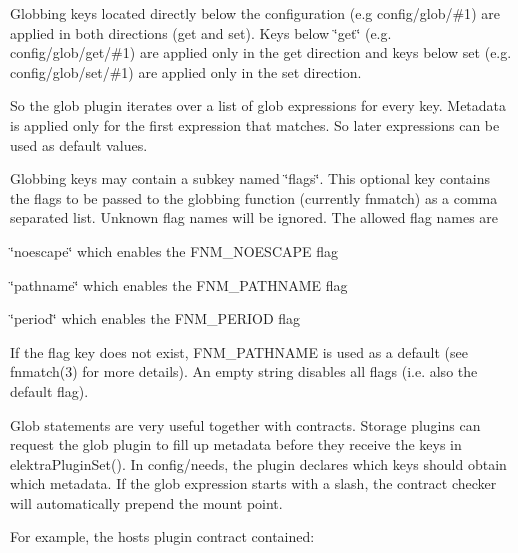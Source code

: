Globbing keys located directly below the configuration (e.\+g {\ttfamily config/glob/\#1}) are applied in both directions (get and set). Keys below \char`\"{}get\char`\"{} (e.\+g. {\ttfamily config/glob/get/\#1}) are applied only in the get direction and keys below set (e.\+g. {\ttfamily config/glob/set/\#1}) are applied only in the set direction.

So the glob plugin iterates over a list of glob expressions for every key. Metadata is applied only for the first expression that matches. So later expressions can be used as default values.

Globbing keys may contain a subkey named \char`\"{}flags\char`\"{}. This optional key contains the flags to be passed to the globbing function (currently fnmatch) as a comma separated list. Unknown flag names will be ignored. The allowed flag names are


\begin{DoxyItemize}
\item \char`\"{}noescape\char`\"{} which enables the F\+N\+M\+\_\+\+N\+O\+E\+S\+C\+A\+PE flag
\item \char`\"{}pathname\char`\"{} which enables the F\+N\+M\+\_\+\+P\+A\+T\+H\+N\+A\+ME flag
\item \char`\"{}period\char`\"{} which enables the F\+N\+M\+\_\+\+P\+E\+R\+I\+OD flag
\end{DoxyItemize}

If the flag key does not exist, F\+N\+M\+\_\+\+P\+A\+T\+H\+N\+A\+ME is used as a default (see fnmatch(3) for more details). An empty string disables all flags (i.\+e. also the default flag).

Glob statements are very useful together with contracts. Storage plugins can request the glob plugin to fill up metadata before they receive the keys in {\ttfamily elektra\+Plugin\+Set()}. In {\ttfamily config/needs}, the plugin declares which keys should obtain which metadata. If the glob expression starts with a slash, the contract checker will automatically prepend the mount point.

For example, the hosts plugin contract contained\+:


